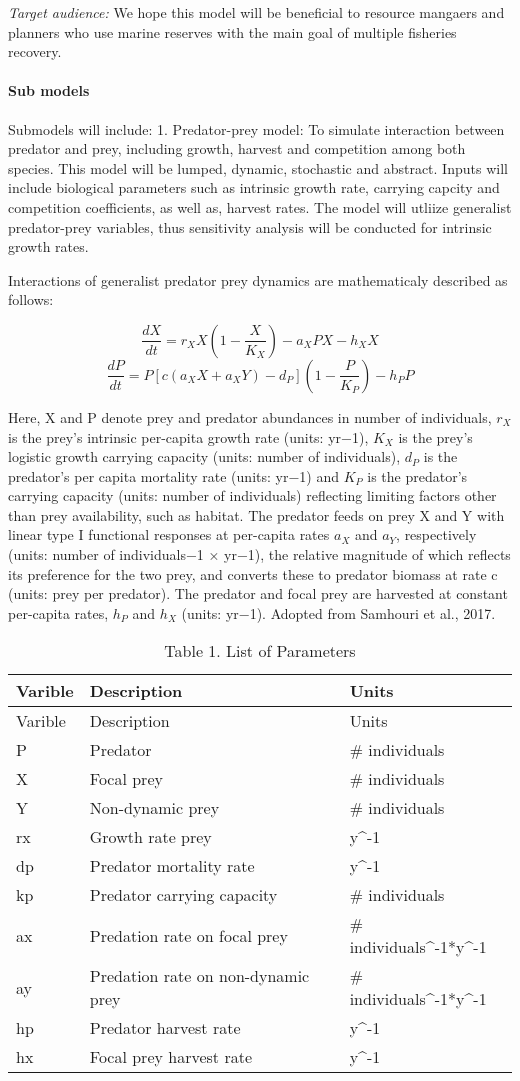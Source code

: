 \documentclass[]{article}
\let\oldparagraph\paragraph
\renewcommand{\paragraph}[1]{\oldparagraph{#1}\mbox{}}
\begin{document}
\emph{Target audience:} We hope this model will be beneficial to
resource mangaers and planners who use marine reserves with the main
goal of multiple fisheries recovery.

\paragraph{Sub models}\label{sub-models}

Submodels will include: 1. Predator-prey model: To simulate interaction
between predator and prey, including growth, harvest and competition
among both species. This model will be lumped, dynamic, stochastic and
abstract. Inputs will include biological parameters such as intrinsic
growth rate, carrying capcity and competition coefficients, as well as,
harvest rates. The model will utliize generalist predator-prey
variables, thus sensitivity analysis will be conducted for intrinsic
growth rates.

Interactions of generalist predator prey dynamics are mathematicaly
described as follows:

\[\frac{dX}{dt}=r_XX(1-\frac{X}{K_X})- a_XPX-h_XX\]
\[\frac{dP}{dt}=P[c(a_XX + a_XY)-d_P](1-\frac{P}{K_P})- h_PP\]

Here, X and P denote prey and predator abundances in number of
individuals, \(r_X\) is the prey's intrinsic per-capita growth rate
(units: yr−1), \(K_X\) is the prey's logistic growth carrying capacity
(units: number of individuals), \(d_P\) is the predator's per capita
mortality rate (units: yr−1) and \(K_P\) is the predator's carrying
capacity (units: number of individuals) reflecting limiting factors
other than prey availability, such as habitat. The predator feeds on
prey X and Y with linear type I functional responses at per-capita rates
\(a_X\) and \(a_Y\), respectively (units: number of individuals−1 ×
yr−1), the relative magnitude of which reflects its preference for the
two prey, and converts these to predator biomass at rate c (units: prey
per predator). The predator and focal prey are harvested at constant
per-capita rates, \(h_P\) and \(h_X\) (units: yr−1). Adopted from
Samhouri et al., 2017.

\begin{longtable}[]{@{}lll@{}}
\caption{Table 1. List of Parameters}\tabularnewline
\toprule
Varible & Description & Units\tabularnewline
\midrule
\endfirsthead
\toprule
Varible & Description & Units\tabularnewline
\midrule
\endhead
P & Predator & \# individuals\tabularnewline
X & Focal prey & \# individuals\tabularnewline
Y & Non-dynamic prey & \# individuals\tabularnewline
rx & Growth rate prey & y\^{}-1\tabularnewline
dp & Predator mortality rate & y\^{}-1\tabularnewline
kp & Predator carrying capacity & \# individuals\tabularnewline
ax & Predation rate on focal prey & \#
individuals\^{}-1*y\^{}-1\tabularnewline
ay & Predation rate on non-dynamic prey & \#
individuals\^{}-1*y\^{}-1\tabularnewline
hp & Predator harvest rate & y\^{}-1\tabularnewline
hx & Focal prey harvest rate & y\^{}-1\tabularnewline
\bottomrule
\end{longtable}
\end{document}
